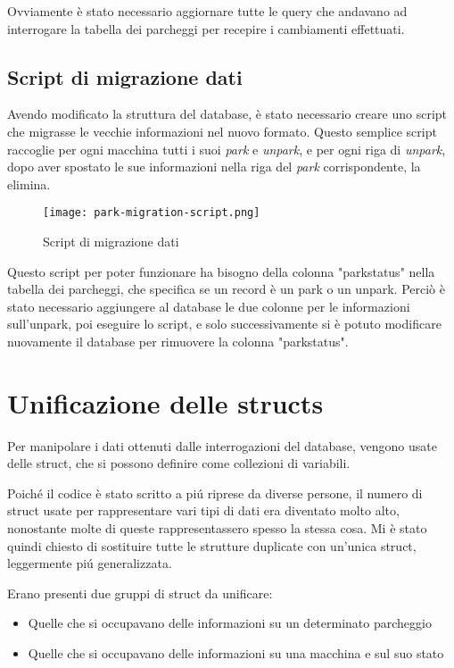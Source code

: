 \documentclass[italian, oneside]{sapthesis} %
\begin{document}
		Ovviamente \`e stato necessario aggiornare tutte le query che andavano ad interrogare la tabella dei parcheggi per recepire i cambiamenti effettuati.

		\pagebreak
		\subsection{Script di migrazione dati}
		Avendo modificato la struttura del database, \`e stato necessario creare uno script che migrasse le vecchie informazioni nel nuovo formato. Questo semplice script raccoglie per ogni macchina tutti i suoi \textit{park} e \textit{unpark}, e per ogni riga di \textit{unpark}, dopo aver spostato le sue informazioni nella riga del \textit{park} corrispondente, la elimina.

		\begin{figure}[h]
			\begin{center}
				\texttt{[image: park-migration-script.png]}
			\end{center}
			\caption{Script di migrazione dati}
			\label{fig:3}
		\end{figure}

		Questo script per poter funzionare ha bisogno della colonna "parkstatus" nella tabella dei parcheggi, che specifica se un record \`e un park o un unpark. Perci\`o \`e stato necessario aggiungere al database le due colonne per le informazioni sull'unpark, poi eseguire lo script, e solo successivamente si \`e potuto modificare nuovamente il database per rimuovere la colonna "parkstatus".
		
	
	\section{Unificazione delle structs}
		Per manipolare i dati ottenuti dalle interrogazioni del database, vengono usate delle struct, che si possono definire come collezioni di variabili.

		Poich\'e il codice \`e stato scritto a pi\'u riprese da diverse persone, il numero di struct usate per rappresentare vari tipi di dati era diventato molto alto, nonostante molte di queste rappresentassero spesso la stessa cosa.
		Mi \`e stato quindi chiesto di sostituire tutte le strutture duplicate con un'unica struct, leggermente pi\'u generalizzata.

		Erano presenti due gruppi di struct da unificare:
		\begin{itemize}
			\item Quelle che si occupavano delle informazioni su un determinato parcheggio
			\item Quelle che si occupavano delle informazioni su una macchina e sul suo stato
		\end{itemize}
\end{document}
